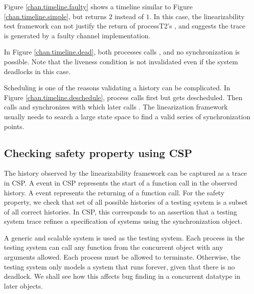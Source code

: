 \documentclass[a4paper, 12pt]{article}
\begin{document}

Figure \ref{chan.timeline.faulty} shows a timeline similar to Figure \ref{chan.timeline.simple}, but  returns $2$ instead of $1$. In this case, the linearizability test framework can not justify the return of process{T2}'s , and suggests the trace is generated by a faulty channel implementation. 


In Figure \ref{chan.timeline.dead}, both processes calls , and no synchronization is possible. Note that the liveness condition is not invalidated even if the system deadlocks in this case.


Scheduling is one of the reasons validating a history can be complicated. In Figure \ref{chan.timeline.deschedule}, process  calls  first but gets descheduled. Then  calls  and synchronizes with  which later calls . The linearization framework usually needs to search a large state space to find a valid series of synchronization points. 


\subsection{Checking safety property using CSP} 
The history observed by the linearizability framework can be captured as a trace in CSP. A  event in CSP represents the start of a function call in the observed history. A  event represents the returning of a function call. For the safety property, we check that set of all possible histories of a testing system is a subset of all correct histories. In CSP, this corresponds to an assertion that a testing system trace refines a specification of systems using the synchronization object. 

A generic and scalable system is used as the testing system. Each process in the testing system can call any function from the concurrent object with any arguments allowed. Each process must be allowed to terminate. Otherwise, the testing system only models a system that runs forever, given that there is no deadlock. We shall see how this affects bug finding in a concurrent datatype in later objects.
\end{document}
